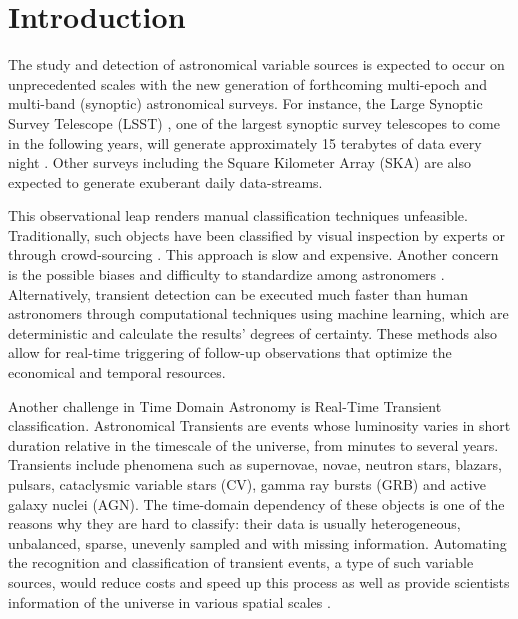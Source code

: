 \documentclass[a4paper,fleqn,usenatbib]{mnras}
\begin{document}


\section{Introduction}

The study and detection of astronomical variable sources is expected
to occur on unprecedented scales with the new generation of
forthcoming multi-epoch and multi-band (synoptic) astronomical
surveys. 
For instance, the Large Synoptic Survey Telescope (LSST)
\citep{0805.2366}, one of the largest synoptic survey telescopes to
come in the following years, will generate approximately 15 terabytes
of data every night \citep{1512.07914}.  
Other surveys including the Square Kilometer Array (SKA) are also expected
to generate exuberant daily data-streams. 

This observational leap renders manual classification techniques
unfeasible.   
Traditionally, such objects have been classified by visual inspection
by experts or through crowd-sourcing
\citep{1011.2199,0708.2750}. 
This approach is slow and expensive.
Another concern is the possible biases and difficulty to standardize among 
astronomers \citep{1104.3142}. 
Alternatively, transient detection can be executed much faster than
human astronomers through computational techniques using machine
learning, 
which are deterministic and calculate the results' degrees of
certainty. 
These methods also allow for real-time triggering of follow-up
observations that optimize the economical and temporal resources. 
 

Another challenge in  Time Domain Astronomy is Real-Time Transient classification. 
Astronomical Transients are events whose luminosity varies in short duration
relative in the timescale of the universe, from minutes to several
years. 
Transients include phenomena such as supernovae, novae, neutron
stars, blazars, pulsars, cataclysmic variable stars (CV), gamma ray
bursts (GRB) and active galaxy nuclei (AGN). 
The time-domain dependency of these objects is one of the reasons why
they are hard to classify: their data is usually heterogeneous,
unbalanced, sparse, unevenly sampled and with missing information. 
Automating the recognition and classification of transient events, a type of such
variable sources, would reduce costs and speed up this process as well
as provide scientists information of the universe in various spatial
scales \citep{2011arXiv1110.4655D}.  
\end{document}
